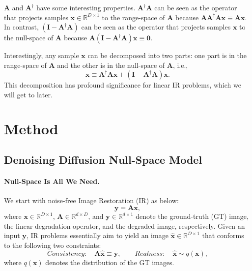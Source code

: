 \documentclass{article} \usepackage{iclr2023_conference,times}
\begin{document}
$\mathbf{A}$ and $\mathbf{A^{\dagger}}$ have some interesting properties. $\mathbf{A^{\dagger}}\mathbf{A}$ can be seen as the operator that projects samples $\mathbf{x}\in\mathbb{R}^{D\times 1}$ to the range-space of $\mathbf{A}$ because $\mathbf{A}\mathbf{A^{\dagger}\mathbf{A}}\mathbf{x}\equiv\mathbf{A}\mathbf{x}$. In contrast, $(\mathbf{I} - \mathbf{A^{\dagger}}\mathbf{A})$ can be seen as the operator that projects samples $\mathbf{x}$ to the null-space of $\mathbf{A}$ because $\mathbf{A}(\mathbf{I} - \mathbf{A^{\dagger}}\mathbf{A})\mathbf{x}\equiv\mathbf{0}$.

Interestingly, any sample $\mathbf{x}$ can be decomposed into two parts: one part is in the range-space of $\mathbf{A}$ and the other is in the null-space of $\mathbf{A}$, i.e.,
\begin{equation}
    \mathbf{x}\equiv\mathbf{A^{\dagger}}\mathbf{A}\mathbf{x} + (\mathbf{I} - \mathbf{A^{\dagger}}\mathbf{A})\mathbf{x}.
    \label{eq:rnd}
\end{equation}
This decomposition has profound significance for linear IR problems, which we will get to later.


\section{Method}
\subsection{Denoising Diffusion Null-Space Model}
\paragraph{Null-Space Is All We Need.} We start with noise-free Image Restoration (IR) as below:
\begin{equation}
    \mathbf{y}= \mathbf{A}\mathbf{x},
    \label{eq:noise-free form}
\end{equation}
where $\mathbf{x}\in\mathbb{R}^{D\times 1}$, $\mathbf{A}\in\mathbb{R}^{d\times D}$, and $\mathbf{y}\in\mathbb{R}^{d\times 1}$ denote the ground-truth (GT) image, the linear degradation operator, and the degraded image, respectively. Given an input $\mathbf{y}$, IR problems essentially aim to yield an image $\hat{\mathbf{x}}\in\mathbb{R}^{D\times 1}$ that conforms to the following two constraints:
\begin{equation}
    \textit{Consistency}: \quad \mathbf{A}\hat{\mathbf{x}} \equiv \mathbf{y},\quad\quad\textit{Realness}: \quad \hat{\mathbf{x}} \sim q(\mathbf{x}),
    \label{eq:consistency}
\end{equation}
where $q(\mathbf{x})$ denotes the distribution of the GT images.
\end{document}
